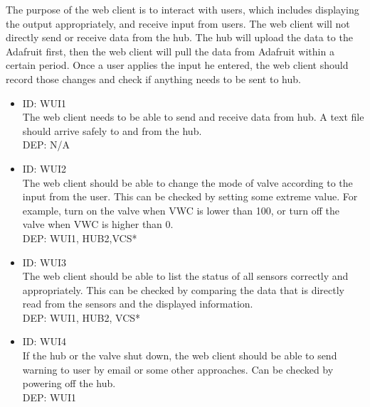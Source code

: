 \documentclass[onecolumn, draftclsnofoot,10pt, compsoc]{IEEEtran}
\newcounter{subsubsubsection}[subsubsection]
\newcounter{subsubsubsubsection}[subsubsubsection]
\begin{document}
	The purpose of the web client is to interact with users, which includes displaying the output appropriately, and receive input from users.
	The web client will not directly send or receive data from the hub.
	The hub will upload the data to the Adafruit first, then the web client will pull the data from Adafruit within a certain period.
	Once a user applies the input he entered, the web client should record those changes and check if anything needs to be sent to hub.
	\begin{itemize}
		\item{
			ID: WUI1\\
			The web client needs to be able to send and receive data from hub. 
			A text file should arrive safely to and from the hub.\\
			DEP:  N/A
		}
		
		\item{
			ID: WUI2\\
			The web client should be able to change the mode of valve according to the input from the user.
			This can be checked by setting some extreme value.
			For example, turn on the valve when VWC is lower than 100, or turn off the valve when VWC is higher than 0.\\
			DEP: WUI1, HUB2,VCS*
		}
		
		\item{
			ID: WUI3\\
			The web client should be able to list the status of all sensors correctly and appropriately.
			This can be checked by comparing the data that is directly read from the sensors and the displayed information.\\
			DEP: WUI1, HUB2, VCS*
		}
		
		\item{
			ID: WUI4\\
			If the hub or the valve shut down, the web client should be able to send warning to user by email or some other approaches. Can be checked by powering off the hub.\\
			DEP: WUI1
		}
	\end{itemize}   
	
\end{document}
